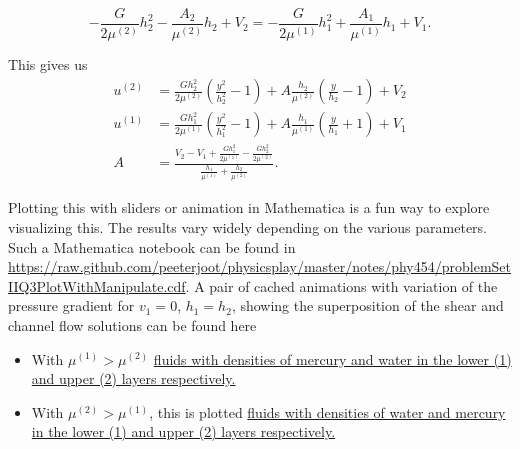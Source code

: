\begin{equation}\label{eqn:continuumProblemSet2:n}
-\frac{G}{2 \mu^{(2)}}h_2^2 - \frac{A_2}{\mu^{(2)}} h_2 + V_2 = -\frac{G}{2 \mu^{(1)}}h_1^2 + \frac{A_1}{\mu^{(1)}} h_1 + V_1.
\end{equation}

This gives us
\begin{align}\label{eqn:continuumProblemSet2:n}
u^{(2)} &= \frac{G h_2^2}{2 \mu^{(2)}}\left(\frac{y^2}{h_2^2} - 1 \right) + A \frac{ h_2}{\mu^{(2)}} \left( \frac{y}{h_2} - 1 \right) + V_2 \\
u^{(1)} &= \frac{G h_1^2}{2 \mu^{(1)}}\left(\frac{y^2}{h_1^2} - 1 \right) + A \frac{ h_1}{\mu^{(1)}} \left( \frac{y}{h_1} + 1 \right) + V_1 \\
A 
&=
\frac{
V_2 - V_1
+ 
\frac{G h_1^2}{2 \mu^{(1)}}
-\frac{G h_2^2}{2 \mu^{(2)}}
}{
\frac{h_1}{\mu^{(1)}}
+\frac{h_2}{\mu^{(2)}}
}.
\end{align}

Plotting this with sliders or animation in Mathematica is a fun way to explore visualizing this.  The results vary widely depending on the various parameters.  Such a Mathematica notebook can be found in \href{https://raw.github.com/peeterjoot/physicsplay/master/notes/phy454/problemSetIIQ3PlotWithManipulate.cdf}{https://raw.github.com/peeterjoot/physicsplay/master/notes/phy454/problemSetIIQ3PlotWithManipulate.cdf}.  A pair of cached animations with variation of the pressure gradient for $v_1 = 0$, $h_1 = h_2$, showing the superposition of the shear and channel flow solutions can be found here

\begin{itemize}
\item With $\mu^{(1)} > \mu^{(2)}$ \href{http://youtu.be/2xVoFAL9XGA}{fluids with densities of mercury and water in the lower (1) and upper (2) layers respectively.}
\item With $\mu^{(2)} > \mu^{(1)}$, this is plotted \href{http://youtu.be/FJekyGf6XJw}{fluids with densities of water and mercury in the lower (1) and upper (2) layers respectively.}
\end{itemize}

\EndNoBibArticle

